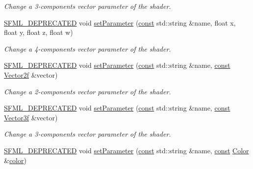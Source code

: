 \begin{DoxyCompactItemize}
\begin{DoxyCompactList}\small\item\em Change a 3-\/components vector parameter of the shader. \end{DoxyCompactList}\item 
\hyperlink{sfml_2dep_2_s_f_m_l-2_84_82_2include_2_s_f_m_l_2_config_8hpp_a9d22ae32bba2961ae9abc7e40f035fc7}{S\-F\-M\-L\-\_\-\-D\-E\-P\-R\-E\-C\-A\-T\-E\-D} void \hyperlink{classsf_1_1_shader_a6d6b84575a5f1a869d70a126df8d6478}{set\-Parameter} (\hyperlink{term__entry_8h_a57bd63ce7f9a353488880e3de6692d5a}{const} std\-::string \&name, float x, float y, float z, float w)
\begin{DoxyCompactList}\small\item\em Change a 4-\/components vector parameter of the shader. \end{DoxyCompactList}\item 
\hyperlink{sfml_2dep_2_s_f_m_l-2_84_82_2include_2_s_f_m_l_2_config_8hpp_a9d22ae32bba2961ae9abc7e40f035fc7}{S\-F\-M\-L\-\_\-\-D\-E\-P\-R\-E\-C\-A\-T\-E\-D} void \hyperlink{classsf_1_1_shader_aee671dda9a84f607b9b780b2796def74}{set\-Parameter} (\hyperlink{term__entry_8h_a57bd63ce7f9a353488880e3de6692d5a}{const} std\-::string \&name, \hyperlink{term__entry_8h_a57bd63ce7f9a353488880e3de6692d5a}{const} \hyperlink{namespacesf_a80cea3c46537294fd1d8d428566ad8b2}{Vector2f} \&vector)
\begin{DoxyCompactList}\small\item\em Change a 2-\/components vector parameter of the shader. \end{DoxyCompactList}\item 
\hyperlink{sfml_2dep_2_s_f_m_l-2_84_82_2include_2_s_f_m_l_2_config_8hpp_a9d22ae32bba2961ae9abc7e40f035fc7}{S\-F\-M\-L\-\_\-\-D\-E\-P\-R\-E\-C\-A\-T\-E\-D} void \hyperlink{classsf_1_1_shader_abf1eb5e74f216c7bcfaf34d08c960ee0}{set\-Parameter} (\hyperlink{term__entry_8h_a57bd63ce7f9a353488880e3de6692d5a}{const} std\-::string \&name, \hyperlink{term__entry_8h_a57bd63ce7f9a353488880e3de6692d5a}{const} \hyperlink{namespacesf_a36e44d9e6d8f649703698ec9d24ac052}{Vector3f} \&vector)
\begin{DoxyCompactList}\small\item\em Change a 3-\/components vector parameter of the shader. \end{DoxyCompactList}\item 
\hyperlink{sfml_2dep_2_s_f_m_l-2_84_82_2include_2_s_f_m_l_2_config_8hpp_a9d22ae32bba2961ae9abc7e40f035fc7}{S\-F\-M\-L\-\_\-\-D\-E\-P\-R\-E\-C\-A\-T\-E\-D} void \hyperlink{classsf_1_1_shader_a66e68e64c06ef5501e50dd5903cab51c}{set\-Parameter} (\hyperlink{term__entry_8h_a57bd63ce7f9a353488880e3de6692d5a}{const} std\-::string \&name, \hyperlink{term__entry_8h_a57bd63ce7f9a353488880e3de6692d5a}{const} \hyperlink{classsf_1_1_color}{Color} \&\hyperlink{_entity_8cpp_a864889304a90873adb9c6e289a54bcf4}{color})

\end{DoxyCompactItemize}
